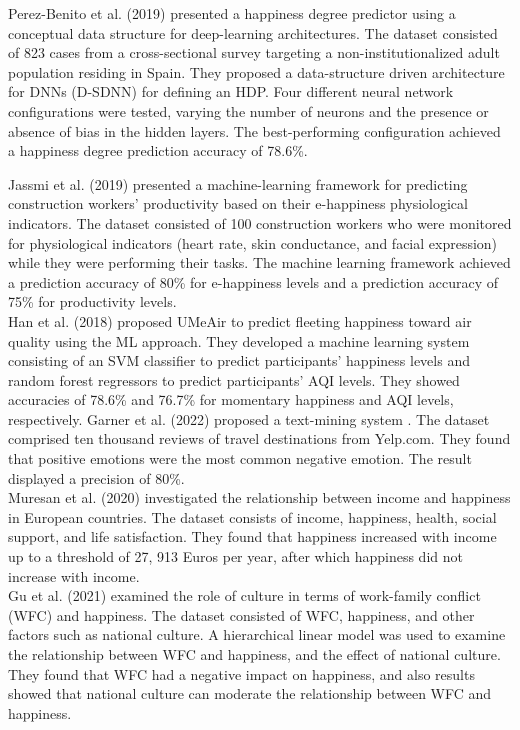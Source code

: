 \documentclass[12pt, a4paper, twoside]{report}
\theoremstyle{plain} %
\theoremstyle{definition} %
\theoremstyle{remark} %
\numberwithin{equation}{chapter}
\begin{document}
Perez-Benito et al. (2019) \cite{perez2019happiness} presented a happiness degree predictor using a conceptual data structure for deep-learning architectures. The dataset consisted of 823 cases from a cross-sectional survey targeting a non-institutionalized adult population residing in Spain. They proposed a data-structure driven architecture for DNNs (D-SDNN) for defining an HDP. Four different neural network configurations were tested, varying the number of neurons and the presence or absence of bias in the hidden layers. The best-performing configuration achieved a happiness degree prediction accuracy of 78.6\%.


Jassmi et al. (2019) \cite{al2019happiness} presented a machine-learning framework for predicting construction workers' productivity based on their e-happiness physiological indicators. The dataset consisted of 100 construction workers who were monitored for physiological indicators (heart rate, skin conductance, and facial expression) while they were performing their tasks. The machine learning framework achieved a prediction accuracy of 80\% for e-happiness levels and a prediction accuracy of 75\% for productivity levels.\\


Han et al. (2018) \cite{han2018umeair} proposed UMeAir to predict fleeting happiness toward air quality using the ML approach. They developed a machine learning system consisting of an SVM classifier to predict participants' happiness levels and random forest regressors to predict participants' AQI levels. They showed accuracies of 78.6\% and 76.7\% for momentary happiness and AQI levels, respectively. 
Garner et al. (2022) proposed a text-mining system \cite{garner2022utilizing}. The dataset comprised ten thousand reviews of travel destinations from Yelp.com. They found that positive emotions were the most common negative emotion. The result displayed a precision of 80\%.\\


Muresan et al. (2020) \cite{muresan2020can} investigated the relationship between income and happiness in European countries. The dataset consists of income, happiness, health, social support, and life satisfaction. They found that happiness increased with income up to a threshold of 27, 913 Euros per year, after which happiness did not increase with income.\\


Gu et al. (2021) \cite{gu2022work} examined the role of culture in terms of work-family conflict (WFC) and happiness. The dataset consisted of WFC, happiness, and other factors such as national culture. A hierarchical linear model was used to examine the relationship between WFC and happiness, and the effect of national culture. They found that WFC had a negative impact on happiness, and also results showed that national culture can moderate the relationship between WFC and happiness.\\
\end{document}
